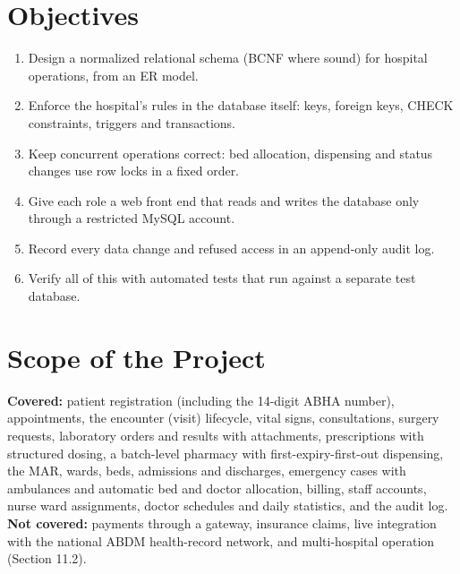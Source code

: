 \section{Objectives}
\begin{enumerate}
\item Design a normalized relational schema (BCNF where sound) for hospital operations, from an ER model.
\item Enforce the hospital's rules in the database itself: keys, foreign keys, CHECK constraints, triggers and transactions.
\item Keep concurrent operations correct: bed allocation, dispensing and status changes use row locks in a fixed order.
\item Give each role a web front end that reads and writes the database only through a restricted MySQL account.
\item Record every data change and refused access in an append-only audit log.
\item Verify all of this with automated tests that run against a separate test database.
\end{enumerate}

\section{Scope of the Project}
\textbf{Covered:} patient registration (including the 14-digit ABHA number), appointments, the encounter (visit)
lifecycle, vital signs, consultations, surgery requests, laboratory orders and results with attachments,
prescriptions with structured dosing, a batch-level pharmacy with first-expiry-first-out dispensing, the MAR,
wards, beds, admissions and discharges, emergency cases with ambulances and automatic bed and doctor allocation,
billing, staff accounts, nurse ward assignments, doctor schedules and daily statistics, and the audit log.
\textbf{Not covered:} payments through a gateway, insurance claims, live integration with the national ABDM
health-record network, and multi-hospital operation (Section 11.2).

